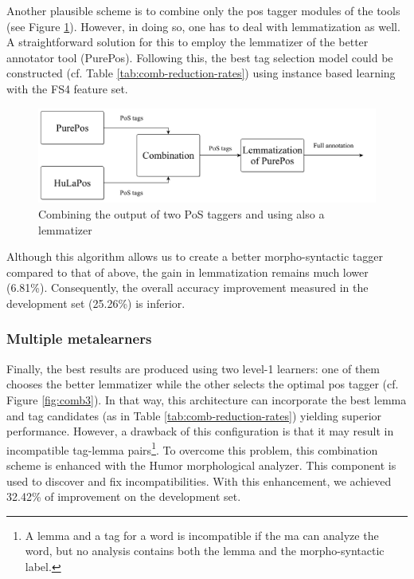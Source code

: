Another plausible scheme is to combine only the \acrshort{pos} tagger modules of the tools (see Figure \ref{fig:comb2}).
However, in doing so, one has to deal with lemmatization as well.
A straightforward solution for this to employ the lemmatizer of the better annotator tool (PurePos).
Following this, the best tag selection model could be constructed (cf.
Table \ref{tab:comb-reduction-rates}) using instance based learning with the FS4 feature set.

\begin{figure}[H]
  \centering
  \includegraphics[scale=0.2]{MorphTagging/comb2.png} 
  \caption{Combining the output of two PoS taggers and using also a lemmatizer}
  \label{fig:comb2}
\end{figure}

Although this algorithm allows us to create a better morpho-syntactic tagger compared to that of above, the gain in lemmatization remains much lower (6.81\%).
Consequently, the overall accuracy improvement measured in the development set (25.26\%) is inferior.

\subsubsection{Multiple metalearners}

Finally, the best results are produced using two level-1 learners: one of them chooses the better lemmatizer while the other selects the optimal \acrshort{pos} tagger (cf. Figure \ref{fig:comb3}).
In that  way, this architecture can incorporate the best lemma and tag candidates (as in Table \ref{tab:comb-reduction-rates}) yielding superior performance.
However, a drawback of this configuration is that it may result in incompatible tag-lemma pairs\footnote{A lemma and a tag for a word is incompatible if the \acrshort{ma} can analyze the word, but no analysis contains both the lemma and the morpho-syntactic label.}.
To overcome this problem, this combination scheme is enhanced with the Humor morphological analyzer.
This component is used to discover and fix incompatibilities.
With this enhancement, we achieved  32.42\% of improvement on the development set.

